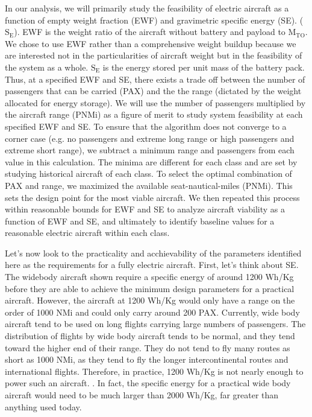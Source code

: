 In our analysis, we will primarily study the feasibility of electric aircraft as a function of empty weight fraction (EWF) and gravimetric specific energy (SE). ($\mathrm{S_{E}}$). EWF is the weight ratio of the aircraft without battery and payload to $\mathrm{M_{TO}}$. We chose to use EWF rather than a comprehensive weight buildup because we are interested not in the particularities of aircraft weight but in the feasibility of the system as a whole. $\mathrm{S_{E}}$ is the energy stored per unit mass of the battery pack. Thus, at a specified EWF and SE, there exists a trade off between the number of passengers that can be carried (PAX) and the the range (dictated by the weight allocated for energy storage). We will use the number of passengers multiplied by the aircraft range (PNMi) as a figure of merit to study system feasibility at each specified EWF and SE. To ensure that the algorithm does not converge to a corner case (e.g. no passengers and extreme long range or high passengers and extreme short range), we subtract a minimum range and passengers from each value in this calculation. The minima are different for each class and are set by studying historical aircraft of each class. To select the optimal combination of PAX and range, we maximized the available seat-nautical-miles (PNMi). This sets the design point for the most viable aircraft. We then repeated this process within reasonable bounds for EWF and SE to analyze aircraft viability as a function of EWF and SE, and ultimately to identify baseline values for a reasonable electric aircraft within each class. 


Let's now look to the practicality and acchievability of the parameters identified here as the requirements for a fully electric aircraft. First, let's think about SE. The widebody aircraft shown require a specific energy of around 1200 Wh/Kg before they are able to achieve the minimum design parameters for a practical aircraft. However, the aircraft at 1200 Wh/Kg would only have a range on the order of 1000 NMi and could only carry around 200 PAX. Currently, wide body aircraft tend to be used on long flights carrying large numbers of passengers. The distribution of flights by wide body aircraft tends to be normal, and they tend toward the higher end of their range. They do not tend to fly many routes as short as 1000 NMi, as they tend to fly the longer intercontinental routes and international flights. Therefore, in practice, 1200 Wh/Kg is not nearly enough to power such an aircraft. . In fact, the specific energy for a practical wide body aircraft would need to be much larger than 2000 Wh/Kg, far greater than anything used today. 

